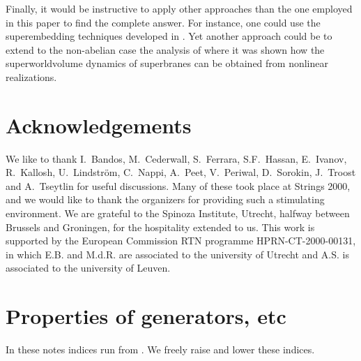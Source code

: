 \documentclass[12pt,a4paper]{article}
\begin{document}
Finally, it would be instructive to apply other approaches than
the one employed in this paper to find the complete answer. For
instance, one could use the superembedding
techniques developed in \cite{Bandos:1995zw,Howe:1997wf}.
Yet another approach could be
to extend to the non-abelian case the analysis of \cite{Bellucci:2000bd}
where it was shown how the superworldvolume dynamics of 
superbranes can be obtained from nonlinear realizations.



\section*{Acknowledgements}
\noindent
We like to thank
I.~Bandos,
M.~Cederwall,
S.~Ferrara,
S.F.~Hassan,
E.~Ivanov,
R.~Kallosh,
U.~Lindstr\"om,
C.~Nappi,
A.~Peet,
V.~Periwal,
D.~Sorokin,
J.~Troost and
A.~Tseytlin
for useful discussions. Many of these took place at Strings 2000, and
we would like to thank the organizers for providing such a stimulating
environment.
We are grateful to the Spinoza Institute, Utrecht, halfway
between Brussels and Groningen, for the hospitality extended to us.
This work is supported by the European Commission
RTN programme HPRN-CT-2000-00131, in which E.B. and M.d.R. are associated
to the university of Utrecht and A.S. is associated to the university of
Leuven.

\appendix

\section{Properties of \coordHE{} generators, etc\label{AppUn}}

In these notes indices \coordHE{} run from \coordHE{}.
We freely raise and lower these indices.
\end{document}
